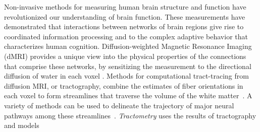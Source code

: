 \documentclass[10pt,%
               aps,%
               prl,%
               preprint,%
               superscriptaddress,%
               preprintnumbers,%
               amsmath,%
               floatfix,%
               endfloats*]{revtex4-1}
\begin{document}
Non-invasive methods for measuring human brain structure and function have
revolutionized our understanding of brain function. These measurements
have demonstrated that interactions between networks of brain regions give rise
to coordinated information processing and to the complex adaptive behavior that
characterizes human cognition. Diffusion-weighted Magnetic Resonance Imaging
(dMRI) provides a unique view into the physical properties of the connections
that comprise these networks, by sensitizing the measurement to the directional
diffusion of water in each voxel \cite{wandell2016clarifying}.
Methods for computational tract-tracing from diffusion MRI, or tractography,
combine the estimates of fiber orientations in each voxel to form streamlines
that traverse the volume of the white matter~\cite{Conturo1999-je,
Mori2002-qi}. A variety of methods can be used to delineate the
trajectory of major neural pathways among these
streamlines~\cite{yeatman2012tract}.
\emph{Tractometry} uses the results of tractography and models
\end{document}
